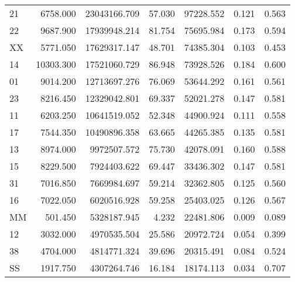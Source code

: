 \begin{tabular}{l|rrrrrr}
          21 &        6758.000 &     23043166.709 &      57.030 &            97228.552 &        0.121 &                 0.563 \\
          22 &        9687.900 &     17939948.214 &      81.754 &            75695.984 &        0.173 &                 0.594 \\
          XX &        5771.050 &     17629317.147 &      48.701 &            74385.304 &        0.103 &                 0.453 \\
          14 &       10303.300 &     17521060.729 &      86.948 &            73928.526 &        0.184 &                 0.600 \\
          01 &        9014.200 &     12713697.276 &      76.069 &            53644.292 &        0.161 &                 0.561 \\
          23 &        8216.450 &     12329042.801 &      69.337 &            52021.278 &        0.147 &                 0.581 \\
          11 &        6203.250 &     10641519.052 &      52.348 &            44900.924 &        0.111 &                 0.558 \\
          17 &        7544.350 &     10490896.358 &      63.665 &            44265.385 &        0.135 &                 0.581 \\
          13 &        8974.000 &      9972507.572 &      75.730 &            42078.091 &        0.160 &                 0.588 \\
          15 &        8229.500 &      7924403.622 &      69.447 &            33436.302 &        0.147 &                 0.581 \\
          31 &        7016.850 &      7669984.697 &      59.214 &            32362.805 &        0.125 &                 0.560 \\
          16 &        7022.050 &      6020516.928 &      59.258 &            25403.025 &        0.126 &                 0.567 \\
          MM &         501.450 &      5328187.945 &       4.232 &            22481.806 &        0.009 &                 0.089 \\
          12 &        3032.000 &      4970535.504 &      25.586 &            20972.724 &        0.054 &                 0.399 \\
          38 &        4704.000 &      4814771.324 &      39.696 &            20315.491 &        0.084 &                 0.524 \\
          SS &        1917.750 &      4307264.746 &      16.184 &            18174.113 &        0.034 &                 0.707 \\

\end{tabular}
